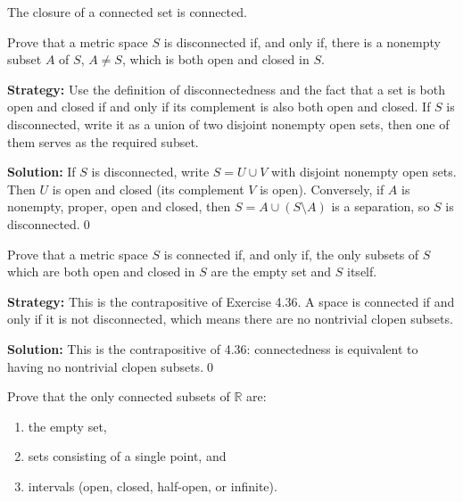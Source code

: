 \begin{theorem}
The closure of a connected set is connected.
\end{theorem}



\begin{problembox}
\begin{problemstatement}
Prove that a metric space $S$ is disconnected if, and only if, there is a nonempty subset $A$ of $S$, $A \neq S$, which is both open and closed in $S$.
\end{problemstatement}
\end{problembox}

\noindent\textbf{Strategy:} Use the definition of disconnectedness and the fact that a set is both open and closed if and only if its complement is also both open and closed. If $S$ is disconnected, write it as a union of two disjoint nonempty open sets, then one of them serves as the required subset.

\bigskip\noindent\textbf{Solution:}
If $S$ is disconnected, write $S=U\cup V$ with disjoint nonempty open sets. Then $U$ is open and closed (its complement $V$ is open). Conversely, if $A$ is nonempty, proper, open and closed, then $S=A\cup(S\setminus A)$ is a separation, so $S$ is disconnected.\qed



\begin{problembox}
\begin{problemstatement}
Prove that a metric space $S$ is connected if, and only if, the only subsets of $S$ which are both open and closed in $S$ are the empty set and $S$ itself.
\end{problemstatement}
\end{problembox}

\noindent\textbf{Strategy:} This is the contrapositive of Exercise 4.36. A space is connected if and only if it is not disconnected, which means there are no nontrivial clopen subsets.

\bigskip\noindent\textbf{Solution:}
This is the contrapositive of 4.36: connectedness is equivalent to having no nontrivial clopen subsets.\qed



\begin{problembox}
\begin{problemstatement}
Prove that the only connected subsets of $\mathbb{R}$ are:
\begin{enumerate}[label=(\alph*)]
\item the empty set,
\item sets consisting of a single point, and
\item intervals (open, closed, half-open, or infinite).
\end{enumerate}
\end{problemstatement}
\end{problembox}

